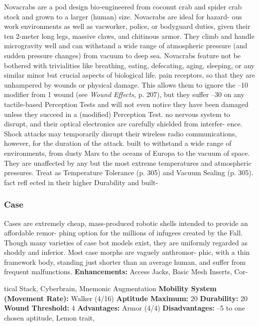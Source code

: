 Novacrabs are a pod design bio-engineered from 
coconut crab and spider crab stock and grown to a 
larger (human) size. Novacrabs are ideal for hazard-
ous work environments as well as vacworker, police, 
or bodyguard duties, given their ten 2-meter long legs, 
massive claws, and chitinous armor. They climb and 
handle microgravity well and can withstand a wide 
range of atmospheric pressure (and sudden pressure 
changes) from vacuum to deep sea. Novacrabs feature 
not be bothered with trivialities like breathing, 
eating, defecating, aging, sleeping, or any similar 
minor but crucial aspects of biological life.
pain receptors, so that they are unhampered by 
wounds or physical damage. This allows them 
to ignore the –10 modifier from 1 wound (see 
\textit{Wound Effects,} p. 207), but they suffer –30 on 
any tactile-based Perception Tests and will not 
even notice they have been damaged unless they 
succeed in a (modified) Perception Test.
no nervous system to disrupt, and their optical 
electronics are carefully shielded from interfer-
ence. Shock attacks may temporarily disrupt their 
wireless radio communications, however, for the 
duration of the attack.
built to withstand a wide range of environments, 
from dusty Mars to the oceans of Europa to the 
vacuum of space. They are unaffected by any but 
the most extreme temperatures and atmospheric 
pressures. Treat as Temperature Tolerance (p. 
305) and Vacuum Sealing (p. 305).
fact refl ected in their higher Durability and built-

\subsubsection{Case}

Cases are extremely cheap, mass-produced robotic 
shells intended to provide an affordable remor-
phing option for the millions of infugees created by 
the Fall. Though many varieties of case bot models 
exist, they are uniformly regarded as shoddy and 
inferior. Most case morphs are vaguely anthromor-
phic, with a thin framework body, standing just 
shorter than an average human, and suffer from 
frequent malfunctions.
\textbf{Enhancements: }Access Jacks, Basic Mesh Inserts, Cor-

tical Stack, Cyberbrain, Mnemonic Augmentation
\textbf{Mobility System (Movement Rate):} Walker (4/16)
\textbf{Aptitude Maximum: }20
\textbf{Durability:} 20
\textbf{Wound Threshold:} 4
\textbf{Advantages:} Armor (4/4)
\textbf{Disadvantages: }–5 to one chosen aptitude, Lemon trait, 

